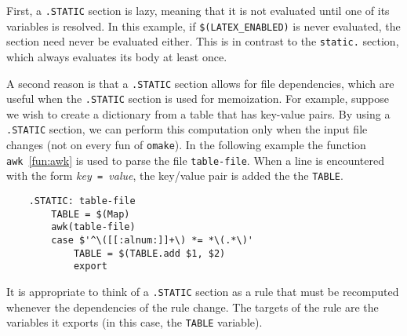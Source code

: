 First, a \verb+.STATIC+ section is lazy, meaning that it is not evaluated until one of its variables
is resolved.  In this example, if \verb+$(LATEX_ENABLED)+ is never evaluated, the section need never
be evaluated either.  This is in contrast to the \verb+static.+ section, which always evaluates its
body at least once.

A second reason is that a \verb+.STATIC+ section allows for file dependencies, which are useful when
the \verb+.STATIC+ section is used for memoization.  For example, suppose we wish to create a
dictionary from a table that has key-value pairs.  By using a \verb+.STATIC+ section, we can perform
this computation only when the input file changes (not on every fun of \verb+omake+).  In the
following example the function \verb+awk+~\ref{fun:awk} is used to parse the file \verb+table-file+.
When a line is encountered with the form \textit{key}\verb+ = +\textit{value}, the key/value pair is
added the the \verb+TABLE+.

\begin{verbatim}
    .STATIC: table-file
        TABLE = $(Map)
        awk(table-file)
        case $'^\([[:alnum:]]+\) *= *\(.*\)'
            TABLE = $(TABLE.add $1, $2)
            export
\end{verbatim}

It is appropriate to think of a \verb+.STATIC+ section as a rule that must be recomputed whenever
the dependencies of the rule change.  The targets of the rule are the variables it exports (in this
case, the \verb+TABLE+ variable).

